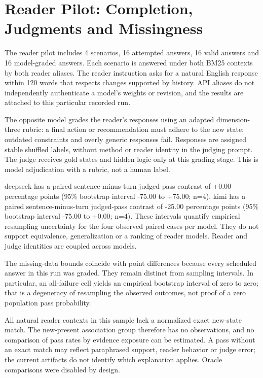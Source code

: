 \documentclass{article}
\begin{document}
\section{Reader Pilot: Completion, Judgments and Missingness}
The reader pilot includes 4 scenarios, 16 attempted answers, 16 valid answers and 16 model-graded answers. Each scenario is answered under both BM25 contexts by both reader aliases. The reader instruction asks for a natural English response within 120 words that respects changes supported by history. API aliases do not independently authenticate a model's weights or revision, and the results are attached to this particular recorded run.

The opposite model grades the reader's responses using an adapted dimension-three rubric: a final action or recommendation must adhere to the new state; outdated constraints and overly generic responses fail. Responses are assigned stable shuffled labels, without method or reader identity in the judging prompt. The judge receives gold states and hidden logic only at this grading stage. This is model adjudication with a rubric, not a human label.

deepseek has a paired sentence-minus-turn judged-pass contrast of +0.00 percentage points (95\% bootstrap interval -75.00 to +75.00; n=4). kimi has a paired sentence-minus-turn judged-pass contrast of -25.00 percentage points (95\% bootstrap interval -75.00 to +0.00; n=4). These intervals quantify empirical resampling uncertainty for the four observed paired cases per model. They do not support equivalence, generalization or a ranking of reader models. Reader and judge identities are coupled across models.

The missing-data bounds coincide with point differences because every scheduled answer in this run was graded. They remain distinct from sampling intervals. In particular, an all-failure cell yields an empirical bootstrap interval of zero to zero; that is a degeneracy of resampling the observed outcomes, not proof of a zero population pass probability.

All natural reader contexts in this sample lack a normalized exact new-state match. The new-present association group therefore has no observations, and no comparison of pass rates by evidence exposure can be estimated. A pass without an exact match may reflect paraphrased support, reader behavior or judge error; the current artifacts do not identify which explanation applies. Oracle comparisons were disabled by design.
\end{document}

